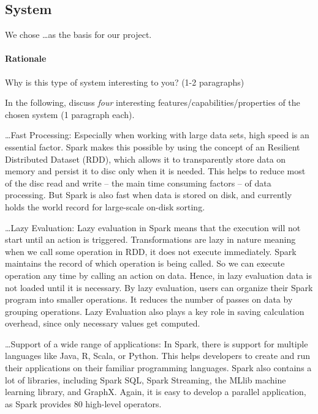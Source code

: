 \subsection{System}
\label{subsec:cp1-system}

We chose \ldots as the basis for our project.

\paragraph{Rationale} Why is this type of system interesting to you? (1-2 paragraphs)

In the following, discuss \emph{four} interesting features/capabilities/properties of the chosen system (1 paragraph each).
\begin{packed_enum}
    \item \ldots Fast Processing: Especially when working with large data sets, high speed is an essential factor. Spark makes this possible by using the concept of an Resilient Distributed Dataset (RDD), which allows it to transparently store data on memory and persist it to disc only when it is needed. This helps to reduce most of the disc read and write –  the main time consuming factors – of data processing. But Spark is also fast when data is stored on disk, and currently holds the world record for large-scale on-disk sorting.     
    
    \item \ldots Lazy Evaluation: Lazy evaluation in Spark means that the execution will not start until an action is triggered. Transformations are lazy in nature meaning when we call some operation in RDD, it does not execute immediately. Spark maintains the record of which operation is being called. So we can execute operation any time by calling an action on data. Hence, in lazy evaluation data is not loaded until it is necessary. By lazy evaluation, users can organize their Spark program into smaller operations. It reduces the number of passes on data by grouping operations. Lazy Evaluation also plays a key role in saving calculation overhead, since only necessary values get computed.
    
    \item \ldots  Support of a wide range of applications: In Spark, there is support for multiple languages like Java, R, Scala, or Python. This helps developers to create and run their applications on their familiar programming languages. Spark also contains a lot of libraries, including Spark SQL, Spark Streaming, the MLlib machine learning library, and GraphX. Again, it is easy to develop a parallel application, as Spark provides 80 high-level operators.
    

\end{packed_enum}
